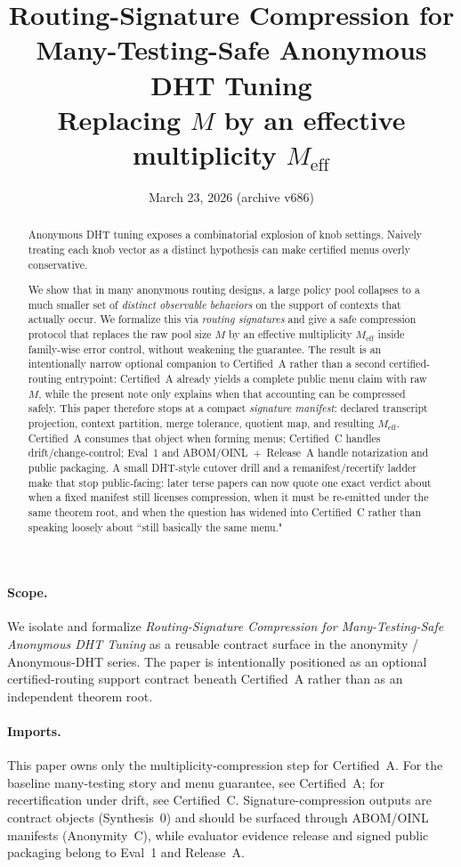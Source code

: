 \documentclass[11pt]{article}
\title{Routing-Signature Compression for Many-Testing-Safe Anonymous DHT Tuning\\
\large Replacing $M$ by an effective multiplicity $M_{\mathrm{eff}}$}
\author{}
\date{March 23, 2026 (archive v686)}
\begin{document}
\maketitle

\begin{abstract}
Anonymous DHT tuning exposes a combinatorial explosion of knob settings.
Naively treating each knob vector as a distinct hypothesis can make certified menus overly conservative.

We show that in many anonymous routing designs, a large policy pool collapses to a much smaller set of \emph{distinct observable behaviors} on the support of contexts that actually occur.
We formalize this via \emph{routing signatures} and give a safe compression protocol that replaces the raw pool size $M$ by an effective multiplicity $M_{\mathrm{eff}}$ inside family-wise error control, without weakening the guarantee.
The result is an intentionally narrow optional companion to Certified~A rather than a second certified-routing entrypoint: Certified~A already yields a complete public menu claim with raw $M$, while the present note only explains when that accounting can be compressed safely.
This paper therefore stops at a compact \emph{signature manifest}: declared transcript projection, context partition, merge tolerance, quotient map, and resulting $M_{\mathrm{eff}}$.
Certified~A consumes that object when forming menus; Certified~C handles drift/change-control; Eval~1 and ABOM/OINL~+~Release~A handle notarization and public packaging.
A small DHT-style cutover drill and a remanifest/recertify ladder make that stop public-facing: later terse papers can now quote one exact verdict about when a fixed manifest still licenses compression, when it must be re-emitted under the same theorem root, and when the question has widened into Certified~C rather than speaking loosely about ``still basically the same menu."
\end{abstract}

\paragraph{Scope.}
We isolate and formalize \emph{Routing-Signature Compression for Many-Testing-Safe Anonymous DHT Tuning} as a reusable contract surface in the anonymity / Anonymous-DHT series. The paper is intentionally positioned as an optional certified-routing support contract beneath Certified~A rather than as an independent theorem root.

\paragraph{Imports.}
This paper owns only the multiplicity-compression step for Certified~A.
For the baseline many-testing story and menu guarantee, see Certified~A; for recertification under drift, see Certified~C.\cite{series:certifiedmenus,series:recert}
Signature-compression outputs are contract objects (Synthesis~0) and should be surfaced through ABOM/OINL manifests (Anonymity~C), while evaluator evidence release and signed public packaging belong to Eval~1 and Release~A.\cite{series:contractobjects,series:abomoinl,series:eval1,series:releaseA}
\end{document}
